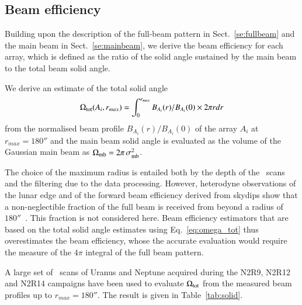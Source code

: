 \subsection{Beam efficiency}
\label{se:beam_efficiency}

Building upon the description of the full-beam pattern in
Sect.~\ref{se:fullbeam} and the main beam in Sect.~\ref{se:mainbeam},
we derive the beam efficiency for each array, which is defined as the
ratio of the solid angle sustained by the main beam to the total beam
solid angle.

We derive an estimate of the total solid angle
\begin{equation}
  \Omega_{\rm{tot}} (A_i, r_{max}) = \int_0^{r_{max}} B_{A_i}(r)/B_{A_i}(0) \times 2 \pi r dr
  \label{eq:omega_tot}
\end{equation}
from the normalised beam profile $B_{A_i}(r)/B_{A_i}(0)$ of the array
$A_i$  at $r_{max} = 180''$ and the main beam solid angle is
evaluated as the volume of the Gaussian main beam as
$\Omega_{\rm{mb}} = 2 \pi\,  \sigma_{\rm{mb}}^2$.

The choice of the maximum radius is entailed both by the depth of
the \bm\ scans and the filtering due to the data processing.   
However, heterodyne observations of the lunar edge and of the forward
beam efficiency derived from skydips show that a non-neglectible
fraction of the full beam is received from beyond a radius of
$180''$~\citep{Greve2010, Kramer2013}. This fraction is not
considered here. Beam efficiency estimators that are based on
the total solid angle estimates using Eq.~\ref{eq:omega_tot} thus
overestimates the beam efficiency, whose the accurate evaluation would
require the measure of the $4\pi$ integral of the full beam pattern.

A large set of \bm\ scans of Uranus and Neptune acquired during the
N2R9, N2R12 and N2R14 campaigns have been used to evaluate
$\Omega_{\rm{tot}}$ from the measured beam profiles up to
$r_{max} =180''$. %
The result is given in Table~\ref{tab:solid}.

